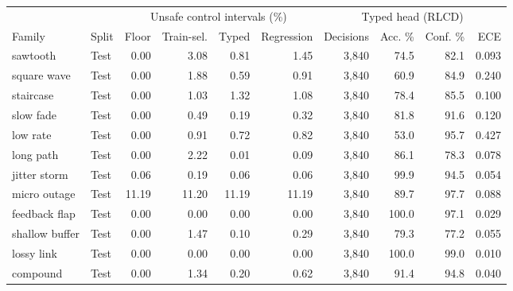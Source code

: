 \begin{tabular}{llrrrrrrrr}
\toprule
 & & \multicolumn{4}{c}{Unsafe control intervals (\%)} & \multicolumn{4}{c}{Typed head (RLCD)} \\
Family & Split & Floor & Train-sel. & Typed & Regression & Decisions & Acc. \% & Conf. \% & ECE \\
\midrule
sawtooth & Test & 0.00 & 3.08 & 0.81 & 1.45 & 3{,}840 & 74.5 & 82.1 & 0.093 \\
square wave & Test & 0.00 & 1.88 & 0.59 & 0.91 & 3{,}840 & 60.9 & 84.9 & 0.240 \\
staircase & Test & 0.00 & 1.03 & 1.32 & 1.08 & 3{,}840 & 78.4 & 85.5 & 0.100 \\
slow fade & Test & 0.00 & 0.49 & 0.19 & 0.32 & 3{,}840 & 81.8 & 91.6 & 0.120 \\
low rate & Test & 0.00 & 0.91 & 0.72 & 0.82 & 3{,}840 & 53.0 & 95.7 & 0.427 \\
long path & Test & 0.00 & 2.22 & 0.01 & 0.09 & 3{,}840 & 86.1 & 78.3 & 0.078 \\
jitter storm & Test & 0.06 & 0.19 & 0.06 & 0.06 & 3{,}840 & 99.9 & 94.5 & 0.054 \\
micro outage & Test & 11.19 & 11.20 & 11.19 & 11.19 & 3{,}840 & 89.7 & 97.7 & 0.088 \\
feedback flap & Test & 0.00 & 0.00 & 0.00 & 0.00 & 3{,}840 & 100.0 & 97.1 & 0.029 \\
shallow buffer & Test & 0.00 & 1.47 & 0.10 & 0.29 & 3{,}840 & 79.3 & 77.2 & 0.055 \\
lossy link & Test & 0.00 & 0.00 & 0.00 & 0.00 & 3{,}840 & 100.0 & 99.0 & 0.010 \\
compound & Test & 0.00 & 1.34 & 0.20 & 0.62 & 3{,}840 & 91.4 & 94.8 & 0.040 \\
\bottomrule
\end{tabular}
